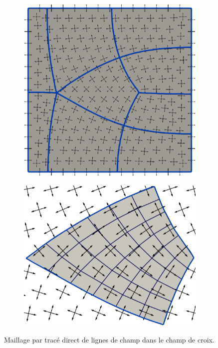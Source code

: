 \begin{figure}[h!]
\centering
\begin{subfigure}{0.49\textwidth}
    \includegraphics[width=\textwidth]{images/mesh_by_streamline_1.pdf}
    \label{fig:mesh_by_streamline_1}
\end{subfigure}
\hfill
\begin{subfigure}{0.49\textwidth}
    \includegraphics[width=\textwidth]{images/mesh_by_streamline_2.pdf}
    \label{fig:mesh_by_streamline_2}
\end{subfigure}
\caption{Maillage par tracé direct de lignes de champ dans le champ de croix.}
\label{fig:mesh_by_streamline}
\end{figure}



